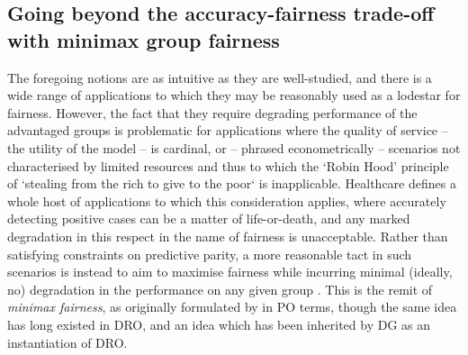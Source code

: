 \subsection{Going beyond the accuracy-fairness trade-off with minimax group
fairness}\label{ssec:minimax-fairness}
The foregoing notions are as intuitive as they are well-studied, and there is a wide
range of applications to which they may be reasonably used as a lodestar for fairness.
%
However, the fact that they require degrading performance of the advantaged groups is problematic
for applications where the quality of service -- the utility of the model -- is cardinal, or --
phrased econometrically -- scenarios not characterised by limited resources  and thus to which the
`Robin Hood' principle of `stealing from the rich to give to the poor` is inapplicable.
%
Healthcare defines a whole host of applications to which this consideration applies, where
accurately detecting positive cases can be a matter of life-or-death, and any marked degradation in
this respect in the name of fairness is unacceptable. 
%
Rather than satisfying constraints on predictive parity, a more reasonable tact in such scenarios
is instead to aim to maximise fairness while incurring minimal (ideally, no) degradation in the
performance on any given group \citep{ustun2019fairness}.
%
This is the remit of \emph{minimax fairness}, as originally formulated by
\citep{martinez2020minimax} in \acf{PO} terms, though the same idea has long existed in \acf{DRO},
and an idea which has been inherited by \ac{DG} as an instantiation of \ac{DRO}. 
%

